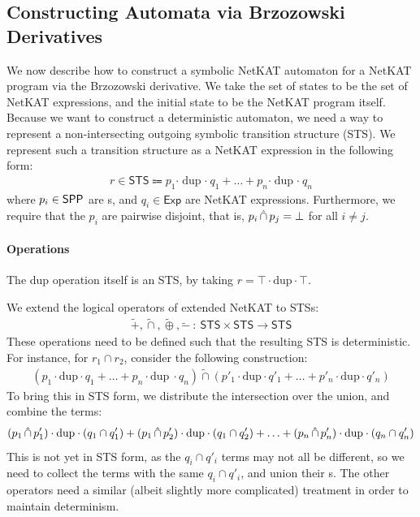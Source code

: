 \documentclass[acmsmall,dvipsnames,nonacm]{acmart}
\begin{document}
\subsection{Constructing Automata via Brzozowski Derivatives}

We now describe how to construct a symbolic NetKAT automaton for a
NetKAT program via the Brzozowski derivative.  We take the set of
states to be the set of NetKAT expressions, and the initial state to
be the NetKAT program itself.  Because we want to construct a
deterministic automaton, we need a way to represent a non-intersecting
outgoing symbolic transition structure (STS).  We represent such a
transition structure as a NetKAT expression in the following form:
\begin{align*}
    r \in \mathsf{STS} \Coloneqq p_1 \cdot \mathrel{\text{dup}} \cdot\ q_1 + \ldots + p_n \cdot \mathrel{\text{dup}} \cdot\ q_n
\end{align*}
where $p_i \in \mathsf{SPP}$ are \SPPn{}s, and $q_i \in \mathsf{Exp}$ are NetKAT expressions.
Furthermore, we require that the $p_i$ are pairwise disjoint, that is, $p_i \mathop{\hat{\cap}} p_j = \bot$ for all $i \neq j$.

\paragraph{Operations}
%
The dup operation itself is an STS, by taking $r = \top \cdot
\text{dup} \cdot \top$.

We extend the logical operators of extended NetKAT to STSs:
\begin{align*}
    \tilde{+}, \tilde{\cap}, \tilde{\oplus}, \tilde{-}\ :\ \mathsf{STS} \times \mathsf{STS} \to \mathsf{STS}
\end{align*}
These operations need to be defined such that the resulting STS is deterministic.
For instance, for $r_1 \cap r_2$, consider the following construction:
\begin{align*}
    (p_1 \cdot \text{dup} \cdot q_1 + \ldots + p_n \cdot \text{dup}\ \cdot q_n) \mathrel{\tilde{\cap}} (p'_1 \cdot \text{dup} \cdot q'_1 + \ldots + p'_n \cdot \text{dup} \cdot q'_n)
\end{align*}
To bring this in STS form, we distribute the intersection over the union, and combine the terms:
\begin{align*}
    (p_1 \mathop{\hat{\cap}} p'_1) \cdot \text{dup} \cdot (q_1 \cap q'_1) +
    (p_1 \mathop{\hat{\cap}} p'_2) \cdot \text{dup} \cdot (q_1 \cap q'_2) +
    \ldots +
    (p_n \mathop{\hat{\cap}} p'_n) \cdot \text{dup} \cdot (q_n \cap q'_n)
\end{align*}
This is not yet in STS form, as the $q_i \cap q'_i$ terms may not all be different, so we need to collect the terms with the same $q_i \cap q'_i$, and union their \SPPn{}s.
The other operators need a similar (albeit slightly more complicated) treatment in order to maintain determinism.
\end{document}
